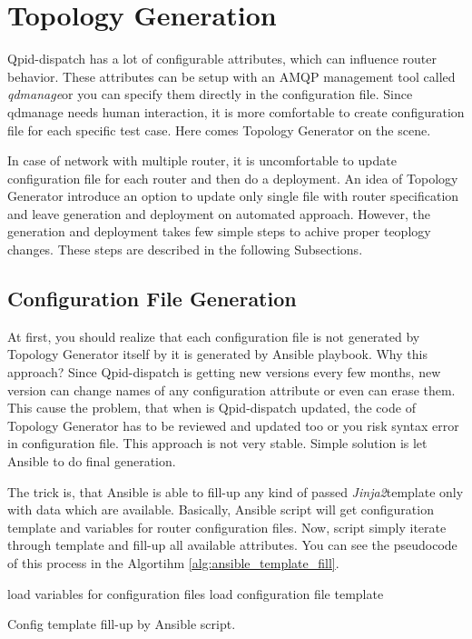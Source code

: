 \section{Topology Generation}
Qpid-dispatch has a lot of configurable attributes, which can influence router behavior. These attributes can be setup with an AMQP management tool called \emph{qdmanage}\footnotemark or you can specify them directly in the configuration file. Since qdmanage needs human interaction, it is more comfortable to create configuration file for each specific test case. Here comes Topology Generator on the scene.


In case of network with multiple router, it is uncomfortable to update configuration file for each router and then do a deployment. An idea of Topology Generator introduce an option to update only single file with router specification and leave generation and deployment on automated approach. However, the generation and deployment takes few simple steps to achive proper teoplogy changes. These steps are described in the following Subsections.

\subsection{Configuration File Generation}
At first, you should realize that each configuration file is not generated by Topology Generator itself by it is generated by Ansible playbook. Why this approach? Since Qpid-dispatch is getting new versions every few months, new version can change names of any configuration attribute or even can erase them. This cause the problem, that when is Qpid-dispatch updated, the code of Topology Generator has to be reviewed and updated too or you risk syntax error in configuration file. This approach is not very stable. Simple solution is let Ansible to do final generation.

The trick is, that Ansible is able to fill-up any kind of passed \emph{Jinja2}\footnotemark template only with data which are available. Basically, Ansible script will get configuration template and variables for router configuration files. Now, script simply iterate through template and fill-up all available attributes. You can see the pseudocode of this process in the Algortihm \ref{alg:ansible_template_fill}.

\begin{center}
	\begin{algorithm}[H]
		 load variables for configuration files\;
		 load configuration file template\;
		 \caption{Config template fill-up by Ansible script.}
		 \label{alg:ansible_template_fill}
	\end{algorithm}
\end{center}

